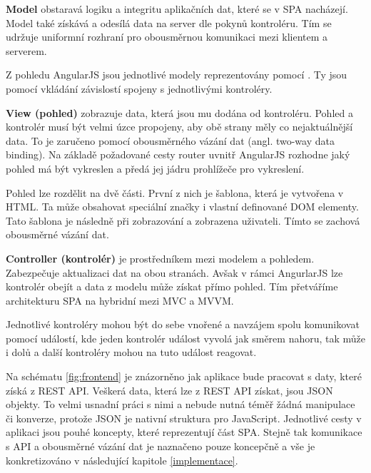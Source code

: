 \begin{description}
    \item {\bf Model} obstaravá logiku a integritu aplikačních dat, které se v SPA nacházejí. Model také získává a odesílá data na server dle pokynů kontroléru. Tím se udržuje uniformní rozhraní pro obousměrnou komunikaci mezi klientem a serverem.

        Z pohledu AngularJS jsou jednotlivé modely reprezentovány pomocí . Ty jsou pomocí vkládání závislostí spojeny s jednotlivými kontroléry.

    \item {\bf View (pohled)} zobrazuje data, která jsou mu dodána od kontroléru. Pohled a kontrolér musí být velmi úzce propojeny, aby obě strany měly co nejaktuálnější data. To je zaručeno pomocí obousměrného vázání dat (angl. two-way data binding). Na základě požadované cesty router uvnitř AngularJS rozhodne jaký pohled má být vykreslen a předá jej jádru prohlížeče pro vykreslení.

        Pohled lze rozdělit na dvě části. První z nich je šablona, která je vytvořena v HTML. Ta může obsahovat speciální značky i vlastní definované DOM elementy. Tato šablona je následně při zobrazování  a zobrazena uživateli. Tímto se zachová obousměrné vázání dat.

    \item {\bf Controller (kontrolér)} je prostředníkem mezi modelem a pohledem. Zabezpečuje aktualizaci dat na obou stranách. Avšak v rámci AngurlarJS lze kontrolér obejít a data z modelu může získat přímo pohled. Tím přetváříme architekturu SPA na hybridní mezi MVC a MVVM.

        Jednotlivé kontroléry mohou být do sebe vnořené a navzájem spolu komunikovat pomocí událostí, kde jeden kontrolér událost vyvolá jak směrem nahoru, tak může i dolů a další kontroléry mohou na tuto událost reagovat.
\end{description}

Na schématu \ref{fig:frontend} je znázorněno jak aplikace bude pracovat s daty, které získá z REST API. Veškerá data, která lze z REST API získat, jsou JSON objekty. To velmi usnadní práci s nimi a nebude nutná téměř žádná manipulace či konverze, protože JSON je nativní struktura pro JavaScript. Jednotlivé cesty v aplikaci jsou pouhé koncepty, které reprezentují část SPA. Stejně tak komunikace s API a obousměrné vázání dat je naznačeno pouze koncepčně a vše je konkretizováno v následující kapitole \ref{implementace}.

